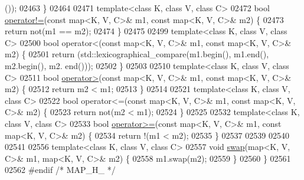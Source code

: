 \begin{DoxyCode}
      ());
02463 \}
02464 
02471 \textcolor{keyword}{template}<\textcolor{keyword}{class} K, \textcolor{keyword}{class} V, \textcolor{keyword}{class} C>
02472 \textcolor{keywordtype}{bool} \hyperlink{classaed2_1_1map_abce0fa35c5b25fd67111c2e704616f09_abce0fa35c5b25fd67111c2e704616f09}{operator!=}(\textcolor{keyword}{const} map<K, V, C>& m1, \textcolor{keyword}{const} map<K, V, C>& m2) \{
02473     \textcolor{keywordflow}{return} not(m1 == m2);
02474 \}
02475 
02499 \textcolor{keyword}{template}<\textcolor{keyword}{class} K, \textcolor{keyword}{class} V, \textcolor{keyword}{class} C>
02500 \textcolor{keywordtype}{bool} operator<(const map<K, V, C>& m1, \textcolor{keyword}{const} map<K, V, C>& m2) \{
02501     \textcolor{keywordflow}{return} (std::lexicographical\_compare(m1.begin(), m1.end(), m2.begin(), m2.
      end()));
02502 \}
02503 
02510 \textcolor{keyword}{template}<\textcolor{keyword}{class} K, \textcolor{keyword}{class} V, \textcolor{keyword}{class} C>
02511 \textcolor{keywordtype}{bool} \hyperlink{classaed2_1_1map_a2000cd874b72034ce7fe730c811b6c63_a2000cd874b72034ce7fe730c811b6c63}{operator>}(\textcolor{keyword}{const} map<K, V, C>& m1, \textcolor{keyword}{const} map<K, V, C>& m2) \{
02512     \textcolor{keywordflow}{return} m2 < m1;
02513 \}
02514 
02521 \textcolor{keyword}{template}<\textcolor{keyword}{class} K, \textcolor{keyword}{class} V, \textcolor{keyword}{class} C>
02522 \textcolor{keywordtype}{bool} operator<=(const map<K, V, C>& m1, \textcolor{keyword}{const} map<K, V, C>& m2) \{
02523     \textcolor{keywordflow}{return} not(m2 < m1);
02524 \}
02525 
02532 \textcolor{keyword}{template}<\textcolor{keyword}{class} K, \textcolor{keyword}{class} V, \textcolor{keyword}{class} C>
02533 \textcolor{keywordtype}{bool} \hyperlink{classaed2_1_1map_a093a6d1a055339c5fc6297a1d47a9159_a093a6d1a055339c5fc6297a1d47a9159}{operator>=}(\textcolor{keyword}{const} map<K, V, C>& m1, \textcolor{keyword}{const} map<K, V, C>& m2) \{
02534     \textcolor{keywordflow}{return} !(m1 < m2);
02535 \}
02537 
02539 
02540 
02541 
02556 \textcolor{keyword}{template}<\textcolor{keyword}{class} K, \textcolor{keyword}{class} V, \textcolor{keyword}{class} C>
02557 \textcolor{keywordtype}{void} \hyperlink{classaed2_1_1map_a119cb2938bbc11c25ebd4fb824782a72_a119cb2938bbc11c25ebd4fb824782a72}{swap}(map<K, V, C>& m1, map<K, V, C>& m2) \{
02558     m1.swap(m2);
02559 \}
02560 \}
02561 
02562 \textcolor{preprocessor}{#endif }\textcolor{comment}{/* MAP\_H\_ */}
\end{DoxyCode}
